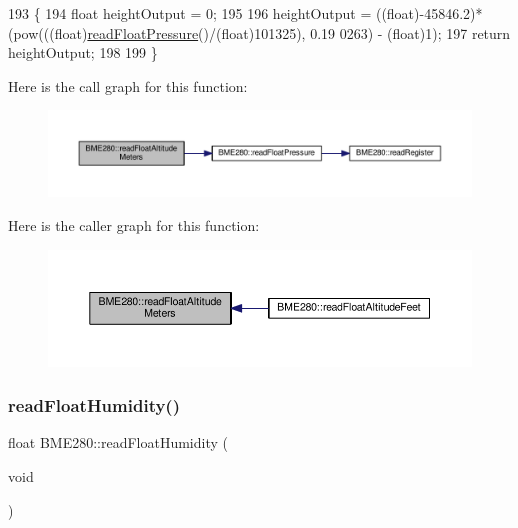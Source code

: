 \begin{DoxyCode}
193 \{
194     \textcolor{keywordtype}{float} heightOutput = 0;
195     
196     heightOutput = ((float)-45846.2)*(pow(((\textcolor{keywordtype}{float})\hyperlink{class_b_m_e280_ada6e799917afb4f228e6253bc56ffe75}{readFloatPressure}()/(\textcolor{keywordtype}{float})101325), 0.19
      0263) - (float)1);
197     \textcolor{keywordflow}{return} heightOutput;
198     
199 \}
\end{DoxyCode}
Here is the call graph for this function\+:\nopagebreak
\begin{figure}[H]
\begin{center}
\leavevmode
\includegraphics[width=350pt]{df/dcf/class_b_m_e280_af67b56ba50760ee1d116acc6c5010221_cgraph}
\end{center}
\end{figure}
Here is the caller graph for this function\+:\nopagebreak
\begin{figure}[H]
\begin{center}
\leavevmode
\includegraphics[width=350pt]{df/dcf/class_b_m_e280_af67b56ba50760ee1d116acc6c5010221_icgraph}
\end{center}
\end{figure}
\mbox{\label{class_b_m_e280_a42ea7232039eebf5aadb391ef6132c35}} 
\subsubsection{\texorpdfstring{read\+Float\+Humidity()}{readFloatHumidity()}}
{\footnotesize\ttfamily float B\+M\+E280\+::read\+Float\+Humidity (\begin{DoxyParamCaption}\item[{void}]{ }\end{DoxyParamCaption})}



